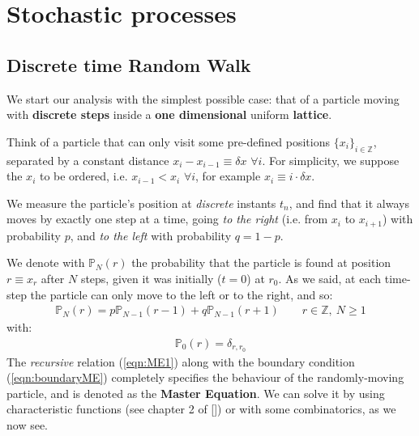 \documentclass[../../main.tex]{subfiles}
\begin{document}

\chapter{Stochastic processes}

\section{Discrete time Random Walk}
We start our analysis with the simplest possible case: that of a particle moving with \textbf{discrete steps} inside a \textbf{one dimensional} uniform \textbf{lattice}. 

Think of a particle that can only visit some pre-defined positions $\{x_i\}_{i \in \mathbb{Z}}$, separated by a constant distance $x_{i}-x_{i-1} \equiv \delta x$ $\forall i$. For simplicity, we suppose the $x_i$ to be ordered, i.e. $x_{i-1} < x_i$ $\forall i$, for example $x_i \equiv i \cdot \delta x$.

We measure the particle's position at \textit{discrete} instants $t_n$, and find that it always moves by exactly one step at a time, going \textit{to the right} (i.e. from $x_i$ to $x_{i+1}$) with probability $p$, and \textit{to the left} with probability $q = 1-p$.   


We denote with $\mathbb{P}_N(r)$ the probability that the particle is found at position $r \equiv x_r$ after $N$ steps, given it was initially ($t=0$) at $r_0$. As we said, at each time-step the particle can only move to the left or to the right, and so:
\begin{align}\label{eqn:ME1}
    \mathbb{P}_N(r) = p \mathbb{P}_{N-1}(r-1) + q \mathbb{P}_{N-1}(r+1) \qquad r \in \mathbb{Z},\>  N \geq 1
\end{align}
with:
\begin{align}
    \mathbb{P}_0(r) = \delta_{r,r_0} \label{eqn:boundaryME}
\end{align}
The \textit{recursive} relation (\ref{eqn:ME1}) along with the boundary condition (\ref{eqn:boundaryME}) completely specifies the behaviour of the randomly-moving particle, and is denoted as the \textbf{Master Equation}. We can solve it by using characteristic functions (see chapter 2 of [])%
or with some combinatorics, as we now see.

\medskip
\end{document}
